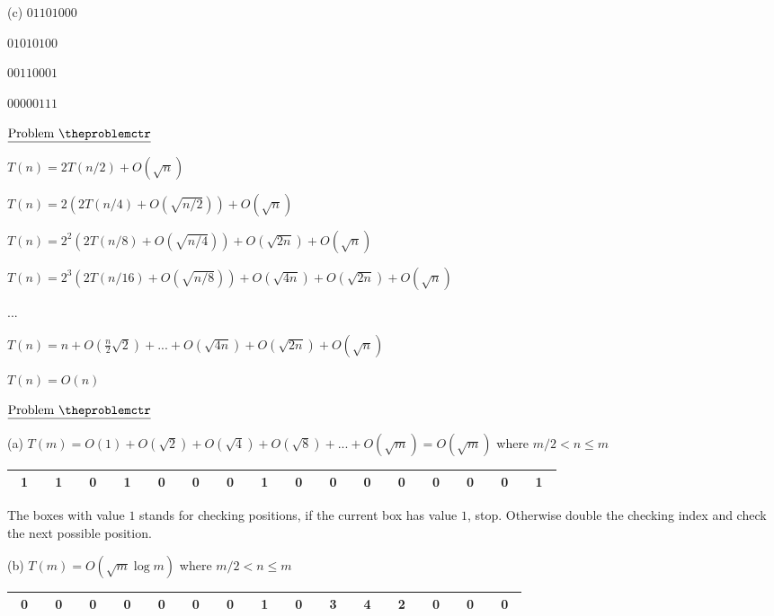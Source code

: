 \documentclass[11pt]{article}
\def\pp{\par\noindent}
\begin{document}
\bigskip
\bigskip
\noindent
(c) $0 1 1 0 1 0 0 0$

$0 1 0 1 0 1 0 0$

$0 0 1 1 0 0 0 1$

$0 0 0 0 0 1 1 1$


\vfill
\newpage
\addtocounter{problemctr}{1}
\bigskip
\noindent
$\underline{\rm Problem\ \theproblemctr}$\pp
\noindent
$T(n) = 2T(n/2)+O(\sqrt{n})$

$T(n) = 2(2T(n/4)+O(\sqrt{n/2}))+O(\sqrt{n})$

$T(n) = 2^2(2T(n/8)+O(\sqrt{n/4}))+O(\sqrt{2n})+O(\sqrt{n})$

$T(n) = 2^3(2T(n/16)+O(\sqrt{n/8}))+O(\sqrt{4n})+O(\sqrt{2n})+O(\sqrt{n})$

...

$T(n) = n+O(\frac{n}{2}\sqrt{2}) + ... +O(\sqrt{4n})+O(\sqrt{2n})+O(\sqrt{n})$

$T(n) = O(n)$


\vfill
\newpage
\addtocounter{problemctr}{1}
\bigskip
\noindent
$\underline{\rm Problem\ \theproblemctr}$\pp
\noindent
(a) $T(m) = O(1)+O(\sqrt{2})+O(\sqrt{4})+O(\sqrt{8})+...+O(\sqrt{m}) = O(\sqrt{m})$ where $m/2<n \le m$

\begin{center}
{
\large
\begin{tabular}{|c|c|c|c|c|c|c|c|c|c|c|c|c|c|c|c|}
\hline
   \mbox{ 1 } & \mbox{ 1 } & \mbox{ 0 } & \mbox{ 1 } 
 & \mbox{ 0 } & \mbox{ 0 } & \mbox{ 0 } & \mbox{ 1 } 
 & \mbox{ 0 } & \mbox{ 0 } & \mbox{ 0 } & \mbox{ 0 } 
 & \mbox{ 0 } & \mbox{ 0 } & \mbox{ 0 } & \mbox{ 1 } 
  \\
\hline
\end{tabular}
}\end{center}

The boxes with value $1$ stands for checking positions, if the current box has value $1$, stop. Otherwise double the checking index and check the next possible position.

\bigskip
\bigskip
\noindent
(b) $T(m) = O(\sqrt{m}\log m)$ where $m/2<n \le m$

\begin{center}
{
\large
\begin{tabular}{|c|c|c|c|c|c|c|c|c|c|c|c|c|c|c|}
\hline
   \mbox{ 0 } & \mbox{ 0 } & \mbox{ 0 } & \mbox{ 0 } 
 & \mbox{ 0 } & \mbox{ 0 } & \mbox{ 0 } & \mbox{ 1 } 
 & \mbox{ 0 } & \mbox{ 3 } & \mbox{ 4 } & \mbox{ 2 } 
 & \mbox{ 0 } & \mbox{ 0 } & \mbox{ 0 }
  \\
\hline
\end{tabular}
}\end{center}
\end{document}
